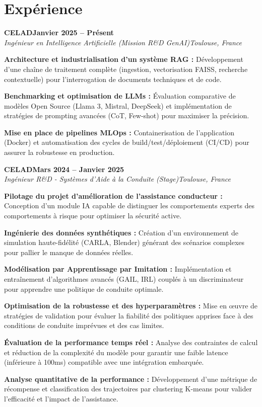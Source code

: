 \documentclass[letterpaper,10pt]{article}
\newcommand{\heading}[2]{
  \hspace{10pt}#1\hfill#2\\
}
\newcommand{\headingBf}[2]{
  \heading{\textbf{#1}}{\textbf{#2}}
}
\newcommand{\headingIt}[2]{
  \heading{\textit{#1}}{\textit{#2}}
}
\newenvironment{resume_list}{
  \vspace{-7pt}
  \begin{itemize}[itemsep=-2px, parsep=1pt, leftmargin=30pt]
}{
  \end{itemize}
}
\begin{document}

\section{Expérience}

\headingBf{CELAD}{Janvier 2025 -- Présent}
\headingIt{Ingénieur en Intelligence Artificielle (Mission R\&D GenAI)}{Toulouse, France}
\begin{resume_list}
  \item \textbf{Architecture et industrialisation d'un système RAG :} Développement d'une chaîne de traitement complète (ingestion, vectorisation FAISS, recherche contextuelle) pour l'interrogation de documents techniques et de code.
  \item \textbf{Benchmarking et optimisation de LLMs :} Évaluation comparative de modèles Open Source (Llama 3, Mistral, DeepSeek) et implémentation de stratégies de prompting avancées (CoT, Few-shot) pour maximiser la précision.
  \item \textbf{Mise en place de pipelines MLOps :} Containerisation de l'application (Docker) et automatisation des cycles de build/test/déploiement (CI/CD) pour assurer la robustesse en production.
\end{resume_list}

\headingBf{CELAD}{Mars 2024 -- Janvier 2025}
\headingIt{Ingénieur R\&D - Systèmes d'Aide à la Conduite (Stage)}{Toulouse, France}
\begin{resume_list}
  \item \textbf{Pilotage du projet d'amélioration de l'assistance conducteur :} Conception d'un module IA capable de distinguer les comportements experts des comportements à risque pour optimiser la sécurité active.
  \item \textbf{Ingénierie des données synthétiques :} Création d'un environnement de simulation haute-fidélité (CARLA, Blender) générant des scénarios complexes pour pallier le manque de données réelles.
  \item \textbf{Modélisation par Apprentissage par Imitation :} Implémentation et entraînement d'algorithmes avancés (GAIL, IRL) couplés à un discriminateur pour apprendre une politique de conduite optimale.
  \item \textbf{Optimisation de la robustesse et des hyperparamètres :} Mise en œuvre de stratégies de validation pour évaluer la fiabilité des politiques apprises face à des conditions de conduite imprévues et des cas limites.
  \item \textbf{Évaluation de la performance temps réel :} Analyse des contraintes de calcul et réduction de la complexité du modèle pour garantir une faible latence (inférieure à 100ms) compatible avec une intégration embarquée.
  \item \textbf{Analyse quantitative de la performance :} Développement d'une métrique de récompense et classification des trajectoires par clustering K-means pour valider l'efficacité et l'impact de l'assistance.
\end{resume_list}
\end{document}
